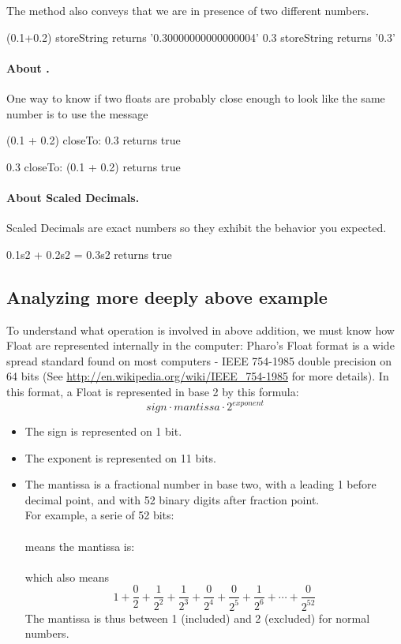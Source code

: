 \documentclass[a4paper,10pt,twoside]{book}
\begin{document}
	
The method  also conveys that we are in presence of two different numbers.
		
\begin{code}{}
(0.1+0.2) storeString 
	returns 	'0.30000000000000004' 
0.3 storeString 
	returns	'0.3'
\end{code}	
		
\paragraph{About .} One way to know if two floats are probably close enough to look like the same number is to use the message 

\begin{code}{}
(0.1 + 0.2) closeTo: 0.3
	returns true

0.3 closeTo: (0.1 + 0.2)
	returns true
\end{code}		
		
		
\paragraph{About Scaled Decimals.}
Scaled Decimals are exact numbers so they exhibit the behavior you expected.

\begin{code}{}
0.1s2 + 0.2s2 = 0.3s2
	returns true
\end{code}		
		

\subsection{Analyzing more deeply above example}
To understand what operation is involved in above addition, we must know how Float are represented internally in the computer: Pharo's Float format is a wide spread standard found on most computers - IEEE 754-1985 double precision on 64 bits
(See \url{http://en.wikipedia.org/wiki/IEEE_754-1985} for more details).
In this format, a Float is represented in base 2 by this formula: \[ sign \cdot mantissa \cdot 2^{exponent} \]
\begin{itemize}
\item
The sign is represented on 1 bit.
\item
The exponent is represented on 11 bits.
\item
The mantissa is a fractional number in base two, with a leading 1 before decimal point, and with 52 binary digits after fraction point.\\
For example, a serie of 52 bits:\\
\\
 means the mantissa is:\\
 \\
 which also means  \[ 1 + \frac{0}{2} +  \frac{1}{2^2} +  \frac{1}{2^3} +  \frac{0}{2^4} +  \frac{0}{2^5} +  \frac{1}{2^6} + \cdots  +  \frac{0}{2^{52}} \]
The mantissa is thus between 1 (included) and 2 (excluded) for normal numbers.
\end{itemize}
\end{document}
